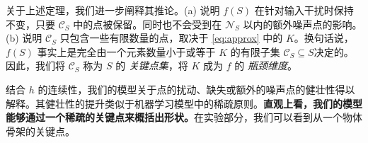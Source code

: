 关于上述定理，我们进一步阐释其推论。(a) 说明 $f(S)$ 在针对输入干扰时保持不变，只要  $\mathcal{C}_S$ 中的点被保留。同时也不会受到在 $\mathcal{N}_S$ 以内的额外噪声点的影响。(b) 说明 $\mathcal{C}_S$ 只包含一些有限数量的点，取决于 \eqref{eq:approx} 中的 $K$。换句话说，$f(S)$ 事实上是完全由一个元素数量小于或等于 $K$ 的有限子集 $\mathcal{C}_S\subseteq S$决定的。因此，我们将 $\mathcal{C}_S$ 称为 $S$ 的 \emph{关键点集}，将 $K$ 成为 $f$ 的 \emph{瓶颈维度}。


结合 $h$ 的连续性，我们的模型关于点的扰动、缺失或额外的噪声点的健壮性得以解释。其健壮性的提升类似于机器学习模型中的稀疏原则。\textbf{直观上看，我们的模型能够通过一个稀疏的关键点来概括出形状。}在实验部分，我们可以看到从一个物体骨架的关键点。





